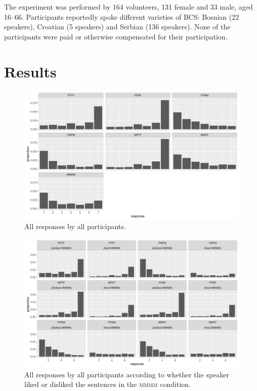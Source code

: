\documentclass[output=paper,
modfonts,
newtxmath,
hidelinks
]{langscibook}
\begin{document}
 The experiment was performed by 164 volunteers, 131 female and 33 male, aged 16--66. Participants reportedly spoke different varieties of BCS: Bosnian (22 speakers), Croatian (5 speakers) and Serbian (136 speakers).
 None of the participants were paid or otherwise compensated for their participation.

\section{Results}


\begin{figure}[t]
		\centering
		\includegraphics[height=.35\textheight]{figures/14mmmm-resps-1.pdf}
		\caption{All responses by all participants.}\label{14:fig:all-resps}
	\end{figure}



\begin{figure}[b]
	\centering
	\includegraphics[height=.35\textheight]{figures/14all-resps.pdf}
	\caption{All responses by all participants according to whether the speaker liked or disliked the sentences in the \textsc{mmmm} condition.}\label{14:fig:all-resps-mmmm}
\end{figure}
\end{document}
